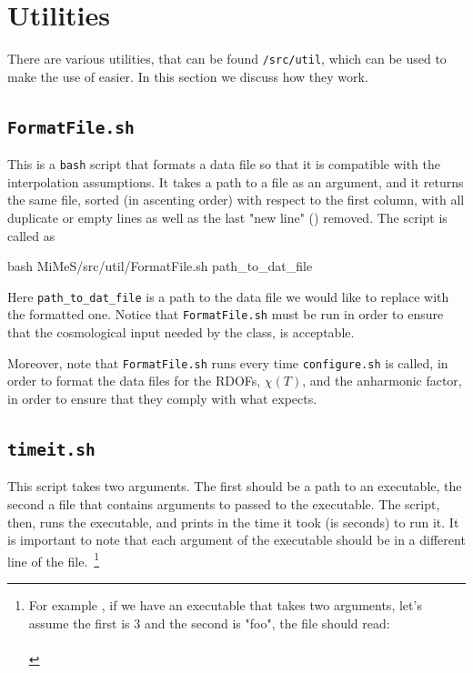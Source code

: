 \documentclass[11pt,a4paper]{article}
\begin{document}
\section{Utilities}\label{app:util}
\setcounter{equation}{0}
%
There are various utilities, that can be found {\tt \mimes/src/util}, which can be used to make the use of \mimes easier. In this section we discuss how they work.

\subsection{\tt FormatFile.sh} 
%
This is a {\tt bash} script that formats a data file so that it is compatible with the interpolation assumptions. It takes a path to a file as an argument, and it returns the same file, sorted (in ascenting order) with respect to the first column, with all duplicate or empty lines as well as the last "new line" (\ie \cppin{\n}) removed. The script is called as 
%
\begin{cpp}
	bash MiMeS/src/util/FormatFile.sh path_to_dat_file
\end{cpp}
%
Here {\tt path\_to\_dat\_file} is a path to the  data file we would like to replace with the formatted one. Notice that {\tt FormatFile.sh} must be run in order to ensure that the cosmological input needed by the  class, is acceptable.

Moreover, note that {\tt FormatFile.sh} runs every time {\tt configure.sh} is called, in order to format the data files for the RDOFs, $\chi(T)$, and the anharmonic factor, in order to ensure that they comply with what \mimes expects. 


\subsection{\tt timeit.sh}
%
This script takes two arguments. The first should be a path to an executable, the second a file that contains arguments to passed to the executable. The script, then, runs the executable, and prints in  the time it took (is seconds) to run it. It is important to note that each argument of the executable should be in a different line of the file.~\footnote{For example , if we have an executable that takes two arguments, let's assume the first is $3$ and the second is "foo", the file should read: \\
\\
}
\end{document}
